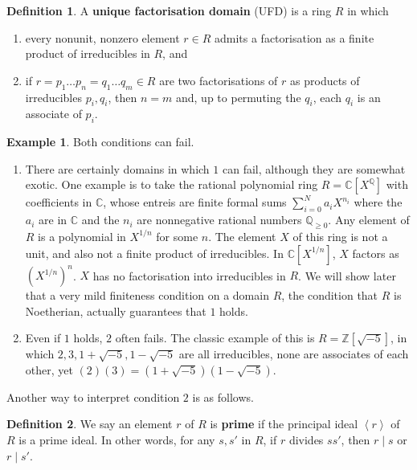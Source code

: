 \documentclass{article}
\newcommand{\Z}{\mathbb{Z}}
\newcommand{\Q}{\mathbb{Q}}
\newcommand{\C}{\mathbb{C}}
\newcommand{\rb}[1]{\left( #1 \right)}
\renewcommand{\sb}[1]{\left[ #1 \right]}
\newcommand{\ab}[1]{\left\langle #1 \right\rangle}
\theoremstyle{definition}\newtheorem{definition}{Definition}[section]
\theoremstyle{definition}\newtheorem{remark}[definition]{Remark}
\theoremstyle{definition}\newtheorem*{example}{Example}
\theoremstyle{definition}\newtheorem*{note}{Note}
\begin{document}
\begin{definition}
A \textbf{unique factorisation domain} (UFD) is a ring $ R $ in which
\begin{enumerate}
\item every nonunit, nonzero element $ r \in R $ admits a factorisation as a finite product of irreducibles in $ R $, and
\item if $ r = p_1 \dots p_n = q_1 \dots q_m \in R $ are two factorisations of $ r $ as products of irreducibles $ p_i, q_i $, then $ n = m $ and, up to permuting the $ q_i $, each $ q_i $ is an associate of $ p_i $.
\end{enumerate}
\end{definition}

\begin{example}
Both conditions can fail.
\begin{enumerate}
\item There are certainly domains in which $ 1 $ can fail, although they are somewhat exotic. One example is to take the rational polynomial ring $ R = \C\sb{X^\Q} $ with coefficients in $ \C $, whose entreis are finite formal sums $ \sum_{i = 0}^N a_iX^{n_i} $ where the $ a_i $ are in $ \C $ and the $ n_i $ are nonnegative rational numbers $ \Q_{\ge 0} $. Any element of $ R $ is a polynomial in $ X^{1 / n} $ for some $ n $. The element $ X $ of this ring is not a unit, and also not a finite product of irreducibles. In $ \C\sb{X^{1 / n}} $, $ X $ factors as $ \rb{X^{1 / n}}^n $. $ X $ has no factorisation into irreducibles in $ R $. We will show later that a very mild finiteness condition on a domain $ R $, the condition that $ R $ is Noetherian, actually guarantees that $ 1 $ holds.
\item Even if $ 1 $ holds, $ 2 $ often fails. The classic example of this is $ R = \Z\sb{\sqrt{-5}} $, in which $ 2, 3, 1 + \sqrt{-5}, 1 - \sqrt{-5} $ are all irreducibles, none are associates of each other, yet $ \rb{2}\rb{3} = \rb{1 + \sqrt{-5}}\rb{1 - \sqrt{-5}} $.
\end{enumerate}
\end{example}

Another way to interpret condition $ 2 $ is as follows.

\begin{definition}
We say an element $ r $ of $ R $ is \textbf{prime} if the principal ideal $ \ab{r} $ of $ R $ is a prime ideal. In other words, for any $ s, s' $ in $ R $, if $ r $ divides $ ss' $, then $ r \mid s $ or $ r \mid s' $.
\end{definition}
\end{document}
